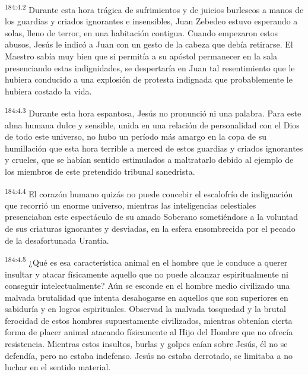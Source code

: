 \par
\textsuperscript{184:4.2} Durante esta hora trágica de sufrimientos y de juicios burlescos a manos de los guardias y criados ignorantes e insensibles, Juan Zebedeo estuvo esperando a solas, lleno de terror, en una habitación contigua. Cuando empezaron estos abusos, Jesús le indicó a Juan con un gesto de la cabeza que debía retirarse. El Maestro sabía muy bien que si permitía a su apóstol permanecer en la sala presenciando estas indignidades, se despertaría en Juan tal resentimiento que le hubiera conducido a una explosión de protesta indignada que probablemente le hubiera costado la vida.

\par
\textsuperscript{184:4.3} Durante esta hora espantosa, Jesús no pronunció ni una palabra. Para este alma humana dulce y sensible, unida en una relación de personalidad con el Dios de todo este universo, no hubo un período más amargo en la copa de su humillación que esta hora terrible a merced de estos guardias y criados ignorantes y crueles, que se habían sentido estimulados a maltratarlo debido al ejemplo de los miembros de este pretendido tribunal sanedrista.

\par
\textsuperscript{184:4.4} El corazón humano quizás no puede concebir el escalofrío de indignación que recorrió un enorme universo, mientras las inteligencias celestiales presenciaban este espectáculo de su amado Soberano sometiéndose a la voluntad de sus criaturas ignorantes y desviadas, en la esfera ensombrecida por el pecado de la desafortunada Urantia.

\par
\textsuperscript{184:4.5} ¿Qué es esa característica animal en el hombre que le conduce a querer insultar y atacar físicamente aquello que no puede alcanzar espiritualmente ni conseguir intelectualmente? Aún se esconde en el hombre medio civilizado una malvada brutalidad que intenta desahogarse en aquellos que son superiores en sabiduría y en logros espirituales. Observad la malvada tosquedad y la brutal ferocidad de estos hombres supuestamente civilizados, mientras obtenían cierta forma de placer animal atacando físicamente al Hijo del Hombre que no ofrecía resistencia. Mientras estos insultos, burlas y golpes caían sobre Jesús, él no se defendía, pero no estaba indefenso. Jesús no estaba derrotado, se limitaba a no luchar en el sentido material.


